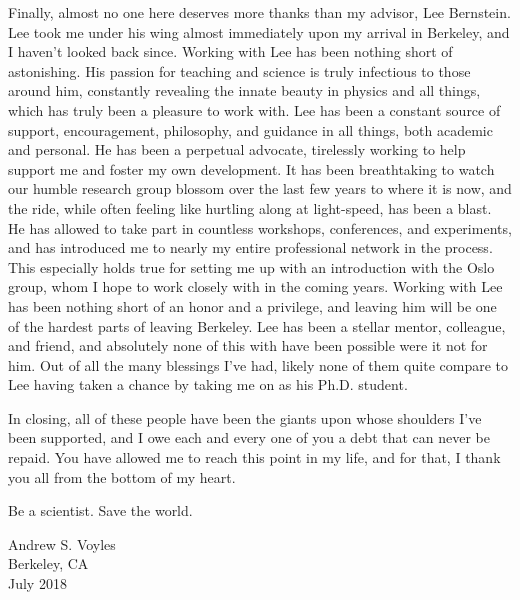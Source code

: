 \documentclass[
]{ucbthesis}
\begin{document}
\begin{frontmatter}
\begin{acknowledgements}
Finally, almost no one here deserves more thanks than my advisor, Lee Bernstein.
Lee took me under his wing almost immediately upon my arrival in Berkeley, and I haven't looked back since.
Working with Lee has been nothing short of astonishing. 
His passion for teaching and science is truly infectious to those around him, constantly revealing the innate beauty in physics and all things,  which has truly been a pleasure to work with.
Lee has been  a constant source of support, encouragement, philosophy, and guidance in all things, both academic and personal.
He has been a perpetual advocate, tirelessly working to help support me and foster my own development.
It has been breathtaking to watch our humble research group blossom over the last few years to where it is now, and the ride, while often feeling  like hurtling along at light-speed, has been a blast.
He has allowed to take part in countless workshops, conferences, and  experiments, and has introduced me to nearly my entire professional network in the process.
This especially holds true for setting me up with an introduction with the Oslo group, whom I hope to work closely with in the coming years. 
Working with Lee has been nothing short of an honor and a privilege, and leaving him will be one of the hardest parts of leaving Berkeley.
Lee has been a stellar mentor, colleague, and friend, and absolutely none of this with have been possible were it not for him.
Out of all the many blessings I've had, likely none of them  quite compare to Lee having  taken a chance by taking me on as his Ph.D. student.





In closing, all of these people have been the giants upon whose shoulders I've been supported, and I owe each and every one of you a debt that can never be repaid.
You have allowed me to reach this point in my life, and for that, I thank you all from the bottom of my heart.

\vspace{5cm}






Be a scientist. Save the world.

\hspace*{\fill} Andrew S. Voyles\\
\hspace*{\fill} Berkeley, CA\\
\hspace*{\fill} July 2018



\end{acknowledgements}

\end{frontmatter}
\end{document}
